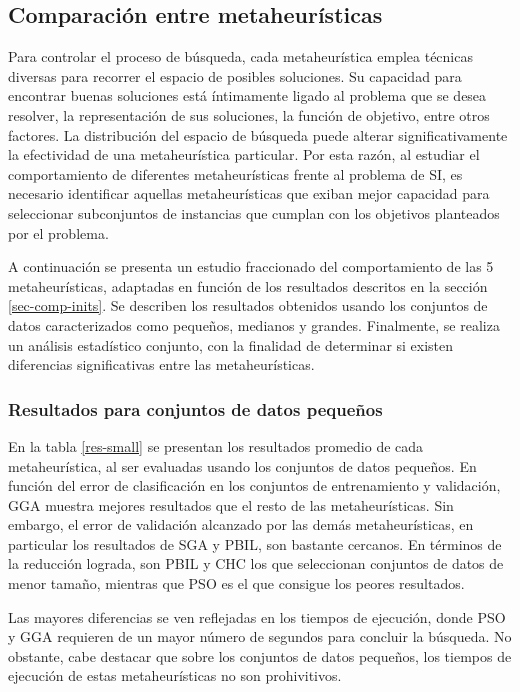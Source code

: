 \subsection{Comparación entre metaheurísticas}
\label{sec-comp-meta}

Para controlar el proceso de búsqueda, cada metaheurística emplea técnicas diversas para recorrer el espacio de posibles soluciones. Su capacidad para encontrar buenas soluciones está íntimamente ligado al problema que se desea resolver, la representación de sus soluciones, la función de objetivo, entre otros factores. La distribución del espacio de búsqueda puede alterar significativamente la efectividad de una metaheurística particular. Por esta razón, al estudiar el comportamiento de diferentes metaheurísticas frente al problema de SI, es necesario identificar aquellas metaheurísticas que exiban mejor capacidad para seleccionar subconjuntos de instancias que cumplan con los objetivos planteados por el problema.

A continuación se presenta un estudio fraccionado del comportamiento de las 5 metaheurísticas, adaptadas en función de los resultados descritos en la sección \ref{sec-comp-inits}. Se describen los resultados obtenidos usando los conjuntos de datos caracterizados como pequeños, medianos y grandes. Finalmente, se realiza un análisis estadístico conjunto, con la finalidad de determinar si existen diferencias significativas entre las metaheurísticas.

\subsubsection{Resultados para conjuntos de datos pequeños}

En la tabla \ref{res-small} se presentan los resultados promedio de cada metaheurística, al ser evaluadas usando los conjuntos de datos pequeños. En función del error de clasificación en los conjuntos de entrenamiento y validación, GGA muestra mejores resultados que el resto de las metaheurísticas. Sin embargo, el error de validación alcanzado por las demás metaheurísticas, en particular los resultados de SGA y PBIL, son bastante cercanos. En términos de la reducción lograda, son PBIL y CHC los que seleccionan conjuntos de datos de menor tamaño, mientras que PSO es el que consigue los peores resultados.

Las mayores diferencias se ven reflejadas en los tiempos de ejecución, donde PSO y GGA requieren de un mayor número de segundos para concluir la búsqueda. No obstante, cabe destacar que sobre los conjuntos de datos pequeños, los tiempos de ejecución de estas metaheurísticas no son prohivitivos.

